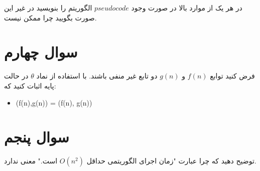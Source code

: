 \documentclass[12pt]{article}
\begin{document}
در هر یک از موارد بالا در صورت وجود $pseudocode$ الگوریتم را بنویسید در غیر این صورت بگویید چرا ممکن نیست.







\section{سوال چهارم}
فرض کنید توابع $f(n)$ و $g(n)$ دو تابع غیر منفی باشند. با استفاده از نماد $\theta$ در حالت پایه اثبات کنید که:

\begin{itemize}
          \item \max(f(n),g(n)) = \Theta(f(n), g(n))
\end{itemize}

\section{سوال پنجم}
توضیح دهید که چرا عبارت "زمان اجرای الگوریتمی حداقل $O(n^2)$ است." معنی ندارد.
\end{document}
